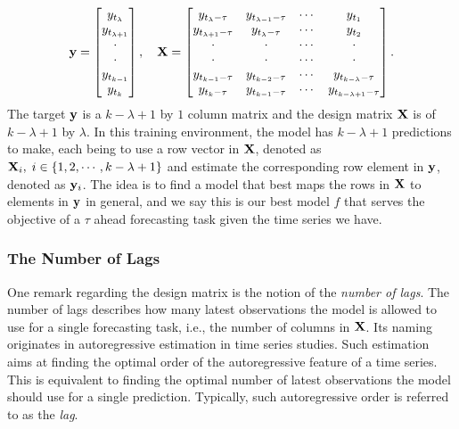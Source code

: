 \begin{equation*}
    \mathbf{y} = \begin{bmatrix}
        y_{t_\lambda}       \\
        y_{t_{\lambda + 1}} \\
        \cdot               \\
        \cdot               \\
        y_{t_{k-1}}         \\
        y_{t_k}             \\
    \end{bmatrix}
    , \quad
    \mathbf{X} = \begin{bmatrix}
        y_{t_{\lambda} - \tau}   & y_{t_{\lambda-1} - \tau} & \cdots & y_{t_{1}} \\
        y_{t_{\lambda+1} - \tau} & y_{t_{\lambda} - \tau}   & \cdots & y_{t_{2}} \\
        \cdot                    & \cdot                    & \cdots & \cdot     \\
        \cdot                    & \cdot                    & \cdots & \cdot     \\
        y_{t_{k-1} - \tau}       & y_{t_{k-2} - \tau}       & \cdots & y_{t_{k - \lambda} - \tau}     \\
        y_{t_{k} - \tau}         & y_{t_{k-1} - \tau}       & \cdots & y_{t_{k - \lambda + 1} - \tau} \\
    \end{bmatrix}.
\end{equation*}
The target $\mathbf{y}$ is a $k-\lambda+1$ by $1$ column matrix and the design matrix $\mathbf{X}$ is of $k-\lambda+1$ by $\lambda$. In this training environment, the model has $k-\lambda + 1$ predictions to make, each being to use a row vector in $\mathbf{X}$, denoted as $\mathbf{X}_i, \; i \in \{1, 2, \cdots, k-\lambda+1 \}$ and estimate the corresponding row element in $\mathbf{y}$, denoted as $\mathbf{y}_i$. The idea is to find a model that best maps the rows in $\mathbf{X}$ to elements in $\mathbf{y}$ in general, and we say this is our best model $f$ that serves the objective of a $\tau$ ahead forecasting task given the time series we have.

\subsubsection{The Number of Lags}
One remark regarding the design matrix is the notion of the \textit{number of lags}. The number of lags describes how many latest observations the model is allowed to use for a single forecasting task, i.e., the number of columns in $\mathbf{X}$. Its naming originates in autoregressive estimation in time series studies. Such estimation aims at finding the optimal order of the autoregressive feature of a time series. This is equivalent to finding the optimal number of latest observations the model should use for a single prediction. Typically, such autoregressive order is referred to as the \textit{lag}.

